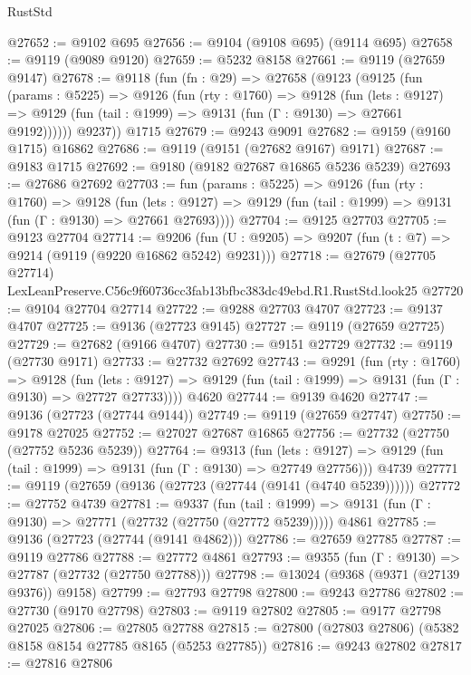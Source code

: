 \begin{lexlean}{RustStd}
\begin{coremodule}
@27652 := @9102 @695
@27656 := @9104 (@9108 @695) (@9114 @695)
@27658 := @9119 (@9089 @9120)
@27659 := @5232 @8158
@27661 := @9119 (@27659 @9147)
@27678 := @9118
    (fun (fn : @29) =>
    @27658
      (@9123
        (@9125
          (fun (params : @5225) =>
          @9126
            (fun (rty : @1760) =>
            @9128
              (fun (lets : @9127) =>
              @9129 (fun (tail : @1999) => @9131 (fun (Γ : @9130) => @27661 @9192))))))
        @9237))
    @1715
@27679 := @9243 @9091
@27682 := @9159 (@9160 @1715) @16862
@27686 := @9119 (@9151 (@27682 @9167) @9171)
@27687 := @9183 @1715
@27692 := @9180 (@9182 @27687 @16865 @5236 @5239)
@27693 := @27686 @27692
@27703 := fun (params : @5225) =>
  @9126
    (fun (rty : @1760) =>
    @9128
      (fun (lets : @9127) =>
      @9129 (fun (tail : @1999) => @9131 (fun (Γ : @9130) => @27661 @27693))))
@27704 := @9125 @27703
@27705 := @9123 @27704
@27714 := @9206
    (fun (U : @9205) => @9207 (fun (t : @7) => @9214 (@9119 (@9220 @16862 @5242) @9231)))
@27718 := @27679 (@27705 @27714) LexLeanPreserve.C56c9f60736cc3fab13bfbc383dc49ebd.R1.RustStd.look25
@27720 := @9104 @27704 @27714
@27722 := @9288 @27703 @4707
@27723 := @9137 @4707
@27725 := @9136 (@27723 @9145)
@27727 := @9119 (@27659 @27725)
@27729 := @27682 (@9166 @4707)
@27730 := @9151 @27729
@27732 := @9119 (@27730 @9171)
@27733 := @27732 @27692
@27743 := @9291
    (fun (rty : @1760) =>
    @9128
      (fun (lets : @9127) =>
      @9129 (fun (tail : @1999) => @9131 (fun (Γ : @9130) => @27727 @27733))))
    @4620
@27744 := @9139 @4620
@27747 := @9136 (@27723 (@27744 @9144))
@27749 := @9119 (@27659 @27747)
@27750 := @9178 @27025
@27752 := @27027 @27687 @16865
@27756 := @27732 (@27750 (@27752 @5236 @5239))
@27764 := @9313
    (fun (lets : @9127) => @9129 (fun (tail : @1999) => @9131 (fun (Γ : @9130) => @27749 @27756)))
    @4739
@27771 := @9119 (@27659 (@9136 (@27723 (@27744 (@9141 (@4740 @5239))))))
@27772 := @27752 @4739
@27781 := @9337
    (fun (tail : @1999) => @9131 (fun (Γ : @9130) => @27771 (@27732 (@27750 (@27772 @5239)))))
    @4861
@27785 := @9136 (@27723 (@27744 (@9141 @4862)))
@27786 := @27659 @27785
@27787 := @9119 @27786
@27788 := @27772 @4861
@27793 := @9355 (fun (Γ : @9130) => @27787 (@27732 (@27750 @27788)))
@27798 := @13024 (@9368 (@9371 (@27139 @9376)) @9158)
@27799 := @27793 @27798
@27800 := @9243 @27786
@27802 := @27730 (@9170 @27798)
@27803 := @9119 @27802
@27805 := @9177 @27798 @27025
@27806 := @27805 @27788
@27815 := @27800 (@27803 @27806) (@5382 @8158 @8154 @27785 @8165 (@5253 @27785))
@27816 := @9243 @27802
@27817 := @27816 @27806

\end{coremodule}
\end{lexlean}
